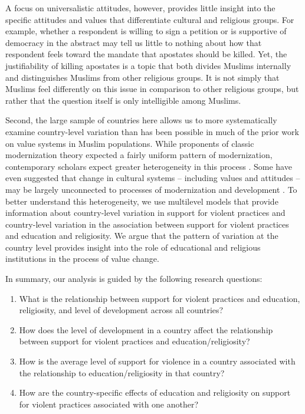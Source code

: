 \documentclass[10pt,letterpaper]{article}
\begin{document}
A focus on universalistic attitudes, however, provides little insight into the specific attitudes and values that differentiate cultural and religious groups. For example, whether a respondent is willing to sign a petition or is supportive of democracy in the abstract may tell us little to nothing about how that respondent feels toward the mandate that apostates should be killed. Yet, the justifiability of killing apostates is a topic that both divides Muslims internally and distinguishes Muslims from other religious groups. It is not simply that Muslims feel differently on this issue in comparison to other religious groups, but rather that the question itself is only intelligible among Muslims.

Second, the large sample of countries here allows us to more systematically examine country-level variation than has been possible in much of the prior work on value systems in Muslim populations. While proponents of classic modernization theory expected a fairly uniform pattern of modernization, contemporary scholars expect greater heterogeneity in this process \cite{eisenstadt_civilizational_2001}. Some have even suggested that change in cultural systems -- including values and attitudes -- may be largely unconnected to processes of modernization and development \cite{huntington_clash_1996}. To better understand this heterogeneity, we use multilevel models that provide information about country-level variation in support for violent practices and country-level variation in the association between support for violent practices and education and religiosity. We argue that the pattern of variation at the country level provides insight into the role of educational and religious institutions in the process of value change.

In summary, our analysis is guided by the following research questions:

\begin{enumerate}
\item
  What is the relationship between support for violent practices and education, religiosity, and level of development across all countries?
\item
  How does the level of development in a country affect the relationship between support for violent practices and education/religiosity?
\item
  How is the average level of support for violence in a country associated with the relationship to education/religiosity in that country?
\item
  How are the country-specific effects of education and religiosity on support for violent practices associated with one another?
\end{enumerate}
\end{document}

